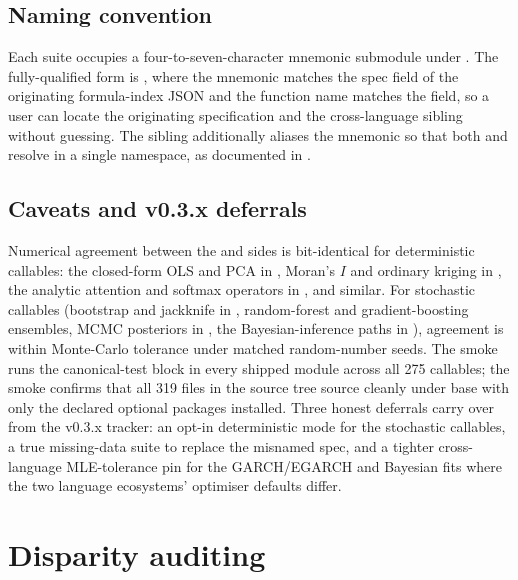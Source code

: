 \documentclass[article,shortnames,nojss]{jss}
\begin{document}
\subsection{Naming convention}\label{sec:textbook-naming}

Each suite occupies a four-to-seven-character mnemonic submodule
under .  The  fully-qualified
form is , where the
mnemonic matches the spec  field of the originating
formula-index JSON and the function name matches the
 field, so a user can locate the originating
specification and the cross-language sibling without guessing.  The  sibling additionally aliases the
mnemonic so that both  and
 resolve in a single namespace,
as documented in \citet{Ruhela2026MorieR}.

\subsection{Caveats and v0.3.x deferrals}\label{sec:textbook-caveats}

Numerical agreement between the  and
 sides is bit-identical for deterministic callables:
the closed-form OLS and PCA in , Moran's
$I$ and ordinary kriging in , the analytic
attention and softmax operators in , and similar.  For stochastic callables
(bootstrap and jackknife in , random-forest
and gradient-boosting ensembles, MCMC posteriors in
, the Bayesian-inference paths in
), agreement is within Monte-Carlo
tolerance under matched random-number seeds.  The
 smoke runs the  canonical-test
block in every shipped module across all 275 callables; the
 smoke confirms that all 319  files in the
source tree source cleanly under base  with only the
declared  optional packages installed.  Three
honest deferrals carry over from the v0.3.x tracker: an opt-in
deterministic mode for the stochastic callables, a true
missing-data suite to replace the misnamed 
spec, and a tighter cross-language MLE-tolerance pin for the
GARCH/EGARCH and Bayesian fits where the two language
ecosystems' optimiser defaults differ.

\section{Disparity auditing}
\label{sec:fairness}
\end{document}
